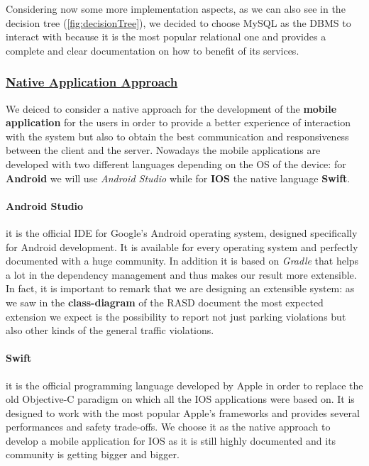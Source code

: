 			Considering now some more implementation aspects, as we can also see in the decision tree (\autoref{fig:decisionTree}), we decided to choose MySQL as the DBMS to interact with because it is the most popular relational one and provides a complete and clear documentation on how to benefit of its services.
			
		\subsubsection[Native Application Approach]{\hyperlink{toc}{Native Application Approach}}
			\label{sec:nativeAppApproach}
			
			We deiced to consider a native approach for the development of the \textbf{mobile application} for the users in order to provide a better experience of interaction with the system but also to obtain the best communication and responsiveness between the client and the server. Nowadays the mobile applications are developed with two different languages depending on the OS of the device: for \textbf{Android} we will use \emph{Android Studio} while for \textbf{IOS} the native language \textbf{Swift}.
			
			\paragraph{Android Studio} it is the official IDE for Google's Android operating system, designed specifically for Android development. It is available for every operating system and perfectly documented with a huge community. In addition it is based on \emph{Gradle} that helps a lot in the dependency management and thus makes our result more extensible. In fact, it is important to remark that we are designing an extensible system: as we saw in the \textbf{class-diagram} of the RASD document \cite{RASD} the most expected extension we expect is the possibility to report not just parking violations but also other kinds of the general traffic violations.
			
			\paragraph{Swift} it is the official programming language developed by Apple in order to replace the old Objective-C paradigm on which all the IOS applications were based on. It is designed to work with the most popular Apple's frameworks and provides several performances and safety trade-offs. We choose it as the native approach to develop a mobile application for IOS as it is still highly documented and its community is getting bigger and bigger.